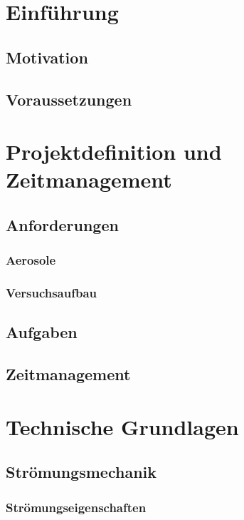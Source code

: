 \chapter{Einf\"{u}hrung}
\section{Motivation}
\section{Voraussetzungen}


\chapter{Projektdefinition und Zeitmanagement}\label{ch:foundations}

\section{Anforderungen}
\subsection{Aerosole}
\subsection{Versuchsaufbau}
\section{Aufgaben}
\section{Zeitmanagement}

\chapter{Technische Grundlagen}\label{ch:foundations}
\section{Str\"{o}mungsmechanik}
\subsection{Str\"{o}mungseigenschaften}
